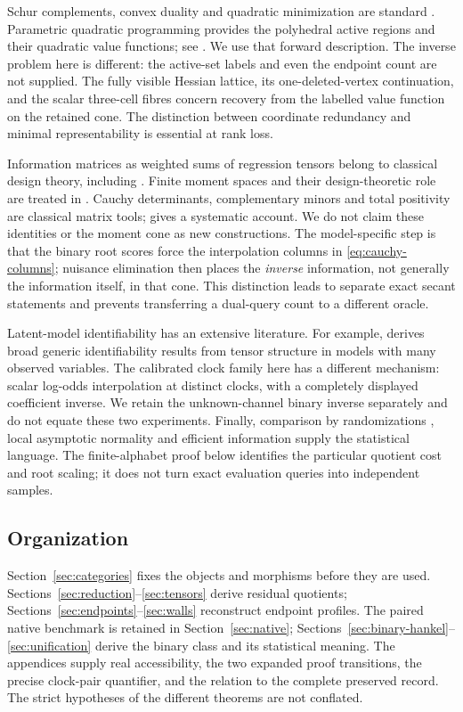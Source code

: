 \documentclass[11pt,reqno]{amsart}
\numberwithin{equation}{section}
\theoremstyle{definition}
\theoremstyle{remark}
\begin{document}
Schur complements, convex duality and quadratic minimization are standard
\cite{BV}. Parametric quadratic programming provides the polyhedral
active regions and their quadratic value functions; see
\cite{BMDP,BMDPc}. We use that forward description. The inverse problem
here is different: the active-set labels and even the endpoint count are
not supplied. The fully visible Hessian lattice, its one-deleted-vertex
continuation, and the scalar three-cell fibres concern recovery from the
labelled value function on the retained cone. The distinction between
coordinate redundancy and minimal representability is essential at rank
loss.

Information matrices as weighted sums of regression tensors belong to
classical design theory, including \cite{KW}. Finite moment spaces and
their design-theoretic role are treated in \cite{DS}. Cauchy determinants,
complementary minors and total positivity are classical matrix tools;
\cite{Pinkus} gives a systematic account. We do not claim these identities
or the moment cone as new constructions. The model-specific step is that
the binary root scores force the interpolation columns in
\eqref{eq:cauchy-columns}; nuisance elimination then places the
\emph{inverse} information, not generally the information itself, in
that cone. This distinction leads to separate exact secant statements
and prevents transferring a dual-query count to a different oracle.

Latent-model identifiability has an extensive literature. For example,
\cite{AMR} derives broad generic identifiability results from tensor
structure in models with many observed variables. The calibrated clock
family here has a different mechanism: scalar log-odds interpolation at
distinct clocks, with a completely displayed coefficient inverse. We
retain the unknown-channel binary inverse separately and do not equate
these two experiments. Finally, comparison by randomizations
\cite{Blackwell}, local asymptotic normality and efficient information
\cite{vdV} supply the statistical language. The finite-alphabet proof
below identifies the particular quotient cost and root scaling; it does
not turn exact evaluation queries into independent samples.

\subsection*{Organization}
Section~\ref{sec:categories} fixes the objects and morphisms before they
are used. Sections~\ref{sec:reduction}--\ref{sec:tensors} derive residual
quotients; Sections~\ref{sec:endpoints}--\ref{sec:walls} reconstruct
endpoint profiles. The paired native benchmark is retained in
Section~\ref{sec:native}; Sections~\ref{sec:binary-hankel}--\ref{sec:unification}
derive the binary class and its statistical meaning. The appendices
supply real accessibility, the two expanded proof transitions, the precise
clock-pair quantifier, and the relation to the complete preserved record.
The strict hypotheses of the different theorems are not conflated.
\end{document}
